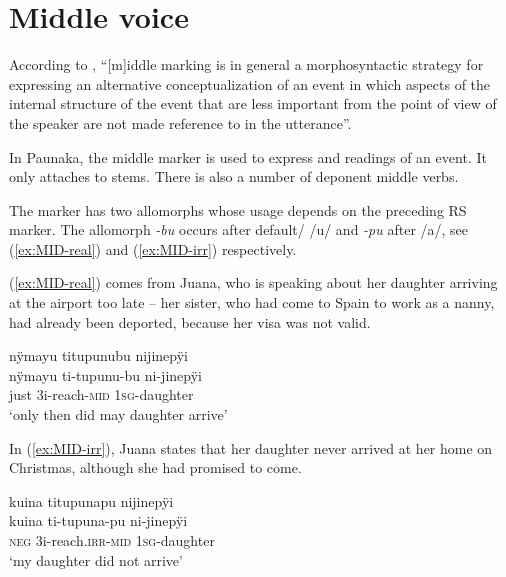 
\section{Middle voice}\label{sec:Middle_voice}

According to \citet[243]{Kemmer1993}, “[m]iddle marking is in general a morphosyntactic strategy for expressing an alternative conceptualization of an event in which aspects of the internal structure of the event that are less important from the point of view of the speaker are not made reference to in the utterance”.

In Paunaka, the middle marker is used to express  and  readings of an event. It only attaches to  stems. There is also a number of deponent middle verbs.

The marker has two allomorphs whose usage depends on the preceding RS marker. The allomorph \textit{-bu} occurs after default/ /u/ and \textit{-pu} after  /a/, see (\ref{ex:MID-real}) and (\ref{ex:MID-irr}) respectively.

(\ref{ex:MID-real}) comes from Juana, who is speaking about her daughter arriving at the airport too late – her sister, who had come to Spain to work as a nanny, had already been deported, because her visa was not valid.

\ea\label{ex:MID-real}
\begingl 
\glpreamble nÿmayu titupunubu nijinepÿi\\
\gla nÿmayu ti-tupunu-bu ni-jinepÿi\\ 
\glb just 3i-reach-\textsc{mid} 1\textsc{sg}-daughter\\ 
\glft ‘only then did may daughter arrive’\\ 
\endgl
 \trailingcitation{[jxx-p110923l-1.334]}
\xe

In (\ref{ex:MID-irr}), Juana states that her daughter never arrived at her home on Christmas, although she had promised to come.

\ea\label{ex:MID-irr}
\begingl 
\glpreamble kuina titupunapu nijinepÿi\\
\gla kuina ti-tupuna-pu ni-jinepÿi\\ 
\glb \textsc{neg} 3i-reach.\textsc{irr}-\textsc{mid} 1\textsc{sg}-daughter\\ 
\glft ‘my daughter did not arrive’\\ 
\endgl
 \trailingcitation{[jxx-p120430l-1.305]}
\xe


